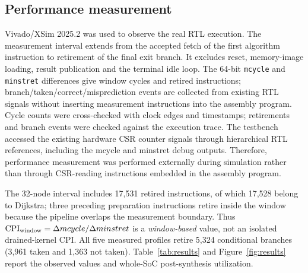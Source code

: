 \documentclass[12pt,a4paper]{article}
\begin{document}
\subsection{Performance measurement}
Vivado/XSim 2025.2 was used to observe the real RTL execution. The measurement interval extends from the accepted fetch of the first algorithm instruction to retirement of the final exit branch. It excludes reset, memory-image loading, result publication and the terminal idle loop. The 64-bit \texttt{mcycle} and \texttt{minstret} differences give window cycles and retired instructions; branch/taken/correct/misprediction events are collected from existing RTL signals without inserting measurement instructions into the assembly program. Cycle counts were cross-checked with clock edges and timestamps; retirements and branch events were checked against the execution trace. The testbench accessed the existing hardware CSR counter signals through hierarchical RTL references, including the mcycle and minstret debug outputs. Therefore, performance measurement was performed externally during simulation rather than through CSR-reading instructions embedded in the assembly program.

The 32-node interval includes 17,531 retired instructions, of which 17,528 belong to Dijkstra; three preceding preparation instructions retire inside the window because the pipeline overlaps the measurement boundary. Thus $\mathrm{CPI}_{\rm window}=\Delta mcycle/\Delta minstret$ is a \emph{window-based} value, not an isolated drained-kernel CPI. All five measured profiles retire 5,324 conditional branches (3,961 taken and 1,363 not taken). Table~\ref{tab:results} and Figure~\ref{fig:results} report the observed values and whole-SoC post-synthesis utilization.

\begin{table}[!htbp]\centering\footnotesize
\caption{32-node performance and Arty A7-100 synthesis results. BRAM is in RAMB36-equivalent tiles.}\label{tab:results}
\end{table}
\end{document}

